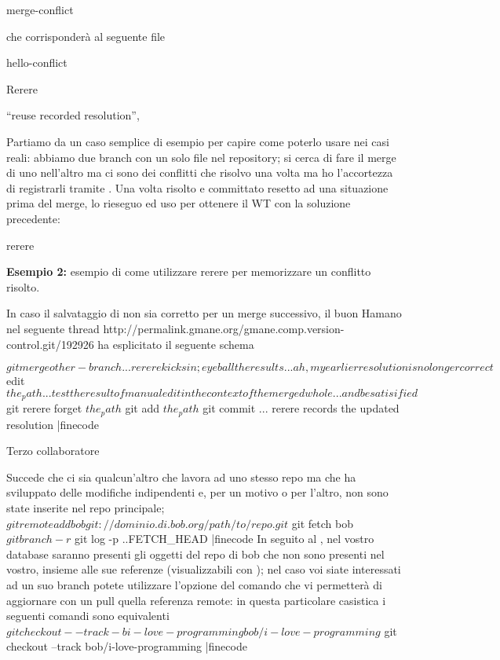  merge-conflict

che corrisponder\`a al seguente file

 hello-conflict

\sezione Rerere

``reuse recorded resolution'', 

Partiamo da un caso semplice di esempio per capire come poterlo usare nei casi
reali: abbiamo due branch con un solo file nel repository; si cerca di fare
il merge di uno nell'altro ma ci sono dei conflitti che risolvo una volta ma
ho l'accortezza di registrarli tramite . Una volta risolto e
committato resetto ad una situazione prima del merge, lo rieseguo ed uso
 per ottenere il WT con la soluzione precedente:

\lonelypage rerere

{\bf Esempio 2:} esempio di come utilizzare rerere per memorizzare un conflitto
risolto.

In caso il salvataggio di  non sia corretto per un merge
successivo, il buon Hamano nel seguente thread http://permalink.gmane.org/gmane.comp.version-control.git/192926
ha esplicitato il seguente schema

\iniziacode
$ git merge other-branch
... rerere kicks in; eyeball the results
... ah, my earlier resolution is no longer correct
$ edit $the_path
... test the result of manual edit in the context of the merged whole
... and be satisified
$ git rerere forget $the_path
$ git add $the_path
$ git commit
... rerere records the updated resolution
|finecode

\sezione Terzo collaboratore

Succede che ci sia qualcun'altro che lavora ad uno stesso repo ma che ha
sviluppato delle modifiche indipendenti e, per un motivo o per l'altro, non sono
state inserite nel repo principale;
\iniziacode
$ git remote add bob git://dominio.di.bob.org/path/to/repo.git
$ git fetch bob
$ git branch -r
$ git log -p ..FETCH_HEAD
|finecode
In seguito al , nel vostro database saranno presenti gli oggetti del
repo di bob che non sono presenti nel vostro, insieme alle sue referenze
(visualizzabili con ); nel caso voi siate interessati ad un suo
branch potete utilizzare l'opzione  del comando 
che vi permetter\`a di aggiornare con un pull quella referenza remote: in questa
particolare casistica i seguenti comandi sono equivalenti
\iniziacode
$ git checkout --track -b i-love-programming bob/i-love-programming
$ git checkout --track bob/i-love-programming
|finecode

